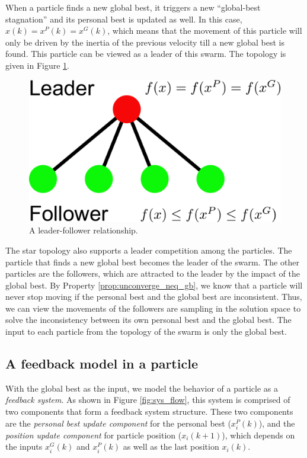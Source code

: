 When a particle finds a new global best, it triggers a new ``global-best stagnation'' and its personal best is updated as well.
In this case, $ x(k) = x^{P}(k) = x^{G}(k) $, which means that the movement of this particle will only be driven by the inertia of the previous velocity till a new global best is found.
This particle can be viewed as a leader of this swarm.
The topology is given in Figure \ref{fig:leader_follower}.
\begin{figure}[tbph]
\centering
\includegraphics[width=0.5\linewidth]{./fig/leader_follower}
\caption{A leader-follower relationship.}
\label{fig:leader_follower}
\end{figure}

The star topology also supports a leader competition among the particles.
The particle that finds a new global best becomes the leader of the swarm.
The other particles are the followers, which are attracted to the leader by the impact of the global best.
By Property \ref{prop:unconverge_neq_gb}, we know that a particle will never stop moving if the personal best and the global best are inconsistent.
Thus, we can view the movements of the followers are sampling in the solution space to solve the inconsistency between its own personal best and the global best.
The input to each particle from the topology of the swarm is only the global best.

\subsection{A feedback model in a particle}

With the global best as the input, we model the behavior of a particle as a \emph{feedback system}.
As shown in Figure \ref{fig:sys_flow}, this system is comprised of two components that form a feedback system structure.
These two components are the 
\emph{personal best update component} for the personal best ($ x^{P}_{i}(k) $), and the 
\emph{position update component} for particle position ($ x_{i}(k+1) $), which depends on the inputs $ x^{G}_{i}(k) $ and $ x^{P}_{i}(k) $ as well as the last position $ x_{i}(k) $.

